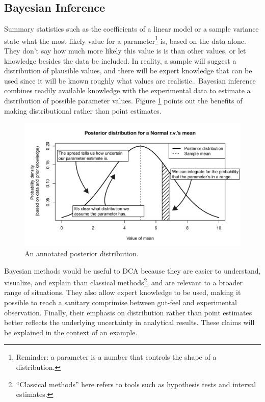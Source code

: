 \documentclass[11pt,a4paper,article]{memoir} %
\begin{document}
\subsection*{Bayesian Inference}
Summary statistics such as the coefficients of a linear model or a sample variance state what the most likely value for a parameter\footnote{Reminder: a parameter is a number that controls the shape of a distribution.} is, based on the data alone. They don't say how much more likely this value is is than other values, or let knowledge besides the data be included. In reality, a sample will suggest a distribution of plausible values, and there will be expert knowledge that can be used since it will be known roughly what values are realistic.. Bayesian inference combines readily available knowledge with the experimental data to estimate a distribution of possible parameter values. Figure \ref{fig:annotated_posterior} points out the benefits of making distributional rather than point estimates.
\begin{figure}[b]
\includegraphics[width=\textwidth]{annotated_posterior.pdf}
\caption{An annotated posterior distribution.}
\label{fig:annotated_posterior}
\end{figure}
\par
Bayesian methods would be useful to DCA because they are easier to understand, visualize, and explain than classical methods\footnote{``Classical methods'' here refers to tools such as hypothesis tests and interval estimates.}, and are relevant to a broader range of situations. They also allow expert knowledge to be used, making it possible to reach a sanitary comprimise between gut-feel and experimental observation. Finally, their emphasis on distribution rather than point estimates better reflects the underlying uncertainty in analytical results. These claims will  be explained in the context of an example.
\end{document}
